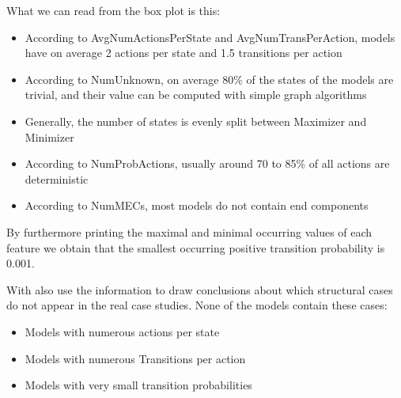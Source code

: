 \FloatBarrier
What we can read from the box plot is this:
\begin{itemize}
    \item According to AvgNumActionsPerState and AvgNumTransPerAction, models have on average 2 actions per state and 1.5 transitions per action
    \item According to NumUnknown, on average 80\% of the states of the models are trivial, and their value can be computed with simple graph algorithms 
    \item Generally, the number of states is evenly split between Maximizer and Minimizer
    \item According to NumProbActions, usually around 70 to 85\% of all actions are deterministic
    \item According to NumMECs, most models do not contain end components
\end{itemize}

By furthermore printing the maximal and minimal occurring values of each feature we obtain that the smallest occurring positive transition probability is 0.001.

With also use the information to draw conclusions about which structural cases do not appear in the real case studies. 
None of the models contain these cases:
\begin{itemize}
    \item Models with numerous actions per state
    \item Models with numerous Transitions per action
    \item Models with very small transition probabilities
\end{itemize}

